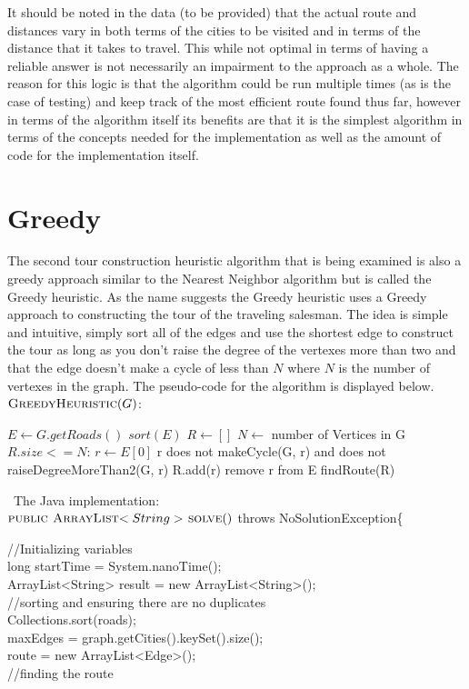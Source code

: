 \documentclass[midd]{thesis}
\newcommand{\tab}{\hspace*{2em}}
\begin{document}
\tab It should be noted in the data (to be provided) that the actual route and distances vary in both terms of the cities to be visited and in terms of the distance that it takes to travel. This while not optimal in terms of having a reliable answer is not necessarily an impairment to the approach as a whole. The reason for this logic is that the algorithm could be run multiple times (as is the case of testing) and keep track of the most efficient route found thus far, however in terms of the algorithm itself its benefits are that it is the simplest algorithm in terms of the concepts needed for the implementation as well as the amount of code for the implementation itself.

\section{Greedy}
\tab The second tour construction heuristic algorithm that is being examined is also a greedy approach similar to the Nearest Neighbor algorithm but is called the Greedy heuristic. As the name suggests the Greedy heuristic uses a Greedy approach to constructing the tour of the traveling salesman. The idea is simple and intuitive, simply sort all of the edges and use the shortest edge to construct the tour as long as you don't raise the degree of the vertexes more than two and that the edge doesn't make a cycle of less than $N$ where $N$ is the number of vertexes in the graph. The pseudo-code for the algorithm is displayed below.\\
$\textnormal{\scshape GreedyHeuristic}(G)$:
\begin{codebox}
\li $E \gets G.getRoads()$
\li $sort(E)$
\li $R \gets []$
\li $N \gets$ number of Vertices in G
\li\While $R.size <= N$:
\li $r \gets E[0]$
\li \If r does not makeCycle(G, r) and does not raiseDegreeMoreThan2(G, r)
\li R.add(r) \End 
\li remove r from E \End
\li\Return findRoute(R)
\end{codebox}\
The Java implementation:\\
$\textnormal{\scshape public ArrayList$<String>$ solve}()$ throws NoSolutionException\{
\begin{codebox}
\tab//Initializing variables\\
\tab long startTime = System.nanoTime();\\	
\tab ArrayList<String> result = new ArrayList<String>();\\
\tab//sorting and ensuring there are no duplicates\\
\tab Collections.sort(roads);\\
\tab maxEdges = graph.getCities().keySet().size();\\
\tab route = new ArrayList<Edge>();\\
\tab//finding the route\\
\end{codebox}
\end{document}
